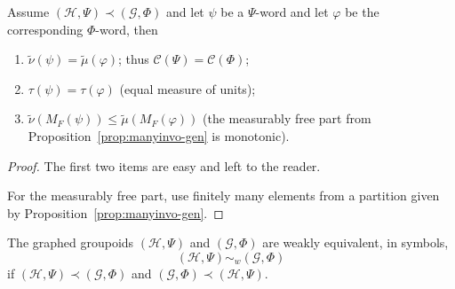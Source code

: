 \documentclass[AHL,Unicode,longabstracts,published]{cedram}
\newcommand{\cost}{\mathcal{C}}
\newcommand{\ch}{\mathcal{H}}
\newcommand{\cg}{\mathcal{G}}
\newcommand{\ph}{\varphi}
\begin{document}
\begin{prop}\label{prop:properties weak-contain graphings}
Assume $(\ch,\Psi) \prec (\cg, \Phi)$ and let $\psi$ be a $\Psi$-word and let $\ph$ be the corresponding $\Phi$-word, then
\begin{enumerate}
\item \label{prop3.19.1}$\widetilde\nu(\psi)=\widetilde\mu(\varphi)$; thus $\cost(\Psi)=\cost(\Phi)$;


\item \label{prop3.19.2}$\tau(\psi)=\tau(\ph)$ (equal measure of units);

\item \label{prop3.19.3}$\widetilde \nu(M_F(\psi))\leq \widetilde \mu(M_F(\ph))$ (the measurably free part from Proposition~\ref{prop:manyinvo-gen} is monotonic).
\end{enumerate}
\end{prop}
\begin{proof}
The first two items are easy and left to the reader.

For the measurably free part, use finitely many elements from a partition given by Proposition~\ref{prop:manyinvo-gen}.
\end{proof}

\begin{defi}\label{def: wek-equiv graphed groupoid}
The graphed grou\-poids $(\ch,\Psi)$ and $(\cg, \Phi)$ are weakly equivalent, in symbols,
\[
(\ch,\Psi) \sim_{w} (\cg, \Phi)
\]
if $(\ch,\Psi) \prec (\cg, \Phi)$ and $(\cg, \Phi)\prec (\ch,\Psi) $.
\end{defi}
\end{document}
